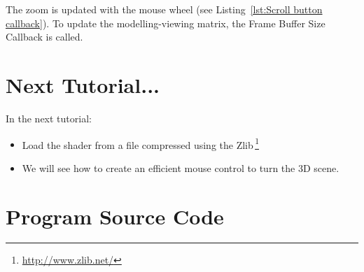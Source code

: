 \documentclass[11pt,oneside,a4paper,final]{article}
\begin{document}
The zoom is updated with the mouse wheel 
(see Listing~\ref{lst:Scroll button callback}). 
To update the modelling-viewing matrix, the Frame Buffer Size Callback is 
called.

\begin{center}

\end{center}


\section{Next Tutorial...}
\label{sec:Next Tutorial}

In the next tutorial:
\begin{itemize}
	\item Load the shader from a file compressed using 
		the Zlib\,\footnote{\url{http://www.zlib.net/}}
%  
% 
	\item We will see how to create an efficient mouse control to turn the 
		3D scene. 
% 
\end{itemize}



\appendix
\section{Program Source Code}
\label{sec:Program Source Code}

\begin{center}
  
\end{center}

% 
% 
\end{document}
